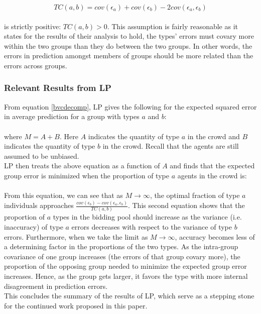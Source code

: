 \documentclass[twoside,twocolumn]{article}
\begin{document}
\begin{equation}
\label{typeco}
TC(a,b) = cov(\epsilon_a) + cov(\epsilon_b) - 2cov(\epsilon_a, \epsilon_b)
\end{equation}\\

is strictly positive: $TC(a,b) > 0$. This assumption is fairly reasonable as it states for the results of their analysis to hold, the types' errors must covary more within the two groups than they do between the two groups. In other words, the errors in prediction amongst members of groups should be more related than the errors across groups.

\subsubsection{Relevant Results from LP}

From equation \ref{bvcdecomp}, LP gives the following for the expected squared error in average prediction for a group with types $a$ and $b$:\\

\\


where $M = A + B$. Here $A$ indicates the quantity of type $a$ in the crowd and $B$ indicates the quantity of type $b$ in the crowd. Recall that the agents are still assumed to be unbiased.\\
\newline
LP then treats the above equation as a function of $A$ and finds that the expected group error is minimized when the proportion of type $a$ agents in the crowd is:\\

\\

From this equation, we can see that as $M \rightarrow \infty$, the optimal fraction of type $a$ individuals approaches $\frac{cov(\epsilon_b) - cov(\epsilon_a,\epsilon_b)}{TC(a,b)}$. This second equation shows that the proportion of $a$ types in the bidding pool should increase as the variance (i.e. inaccuracy) of type $a$ errors decreases with respect to the variance of type $b$ errors. Furthermore, when we take the limit as $M \rightarrow \infty$, accuracy becomes less of a determining factor in the proportions of the two types. As the intra-group covariance of one group increases (the errors of that group covary more), the proportion of the opposing group needed to minimize the expected group error increases. Hence, as the group gets larger, it favors the type with more internal disagreement in prediction errors.\\
\newline
This concludes the summary of the results of LP, which serve as a stepping stone for the continued work proposed in this paper.
\end{document}
